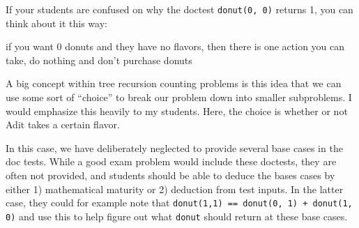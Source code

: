 \begin{questionmeta}
If your students are confused on why the doctest \lstinline{donut(0, 0)} returns 1, 
you can think about it this way:

if you want 0 donuts and they have no flavors, then there is one action you can take, do nothing and don't purchase donuts

A big concept within tree recursion counting problems is this idea that we can use some sort of ``choice'' to break our problem down into smaller subproblems. I would emphasize this heavily to my students. Here, the choice is whether or not Adit takes a certain flavor. 

In this case, we have deliberately neglected to provide several base cases in the doc tests. While a good exam problem would include these doctests, they are often not provided, and students should be able to deduce the bases cases by either 1) mathematical maturity or 2) deduction from test inputs. In the latter case, they could for example note that \lstinline{donut(1,1) == donut(0, 1) + donut(1, 0)} and use this to help figure out what \lstinline{donut} should return at these base cases. 

\end{questionmeta}